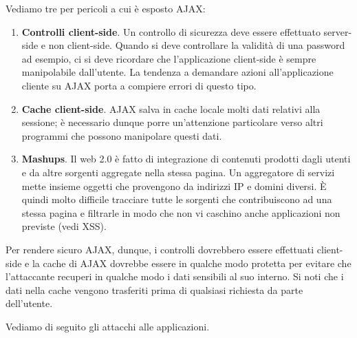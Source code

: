 Vediamo tre per pericoli a cui è esposto AJAX:
\begin{enumerate}
	\item \textbf{Controlli client-side}. Un controllo di sicurezza deve essere effettuato server-side e non client-side. Quando si deve controllare la validità di una password ad esempio, ci si deve ricordare che l'applicazione client-side è
	sempre manipolabile dall'utente. La tendenza a demandare azioni all'applicazione cliente su AJAX porta a compiere errori di questo tipo.
	\item \textbf{Cache client-side}. AJAX salva in cache locale molti dati relativi alla sessione; è necessario dunque porre un'attenzione particolare verso altri programmi che possono manipolare questi dati.
	\item \textbf{Mashups}. Il web 2.0 è fatto di integrazione di contenuti prodotti dagli utenti e da altre sorgenti aggregate nella stessa pagina. Un aggregatore di servizi mette insieme oggetti che provengono da indirizzi IP e domini diversi. È quindi molto difficile tracciare tutte le sorgenti che contribuiscono ad una stessa pagina e filtrarle in modo che non vi caschino anche applicazioni non previste (vedi XSS).
\end{enumerate}
Per rendere sicuro AJAX, dunque, i controlli dovrebbero essere effettuati client-side e la cache di AJAX dovrebbe essere in qualche modo protetta per evitare che l'attaccante recuperi in qualche modo i dati sensibili al suo interno. Si noti che i dati nella cache vengono trasferiti prima di qualsiasi richiesta da parte dell'utente.

Vediamo di seguito gli attacchi alle applicazioni.

